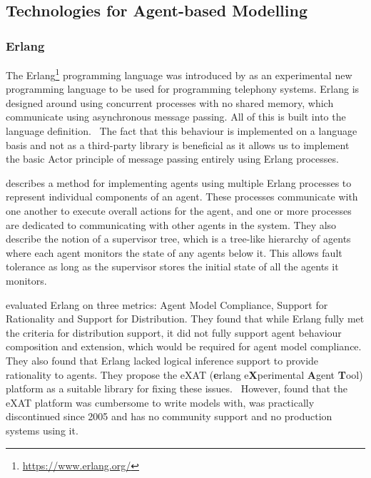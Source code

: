 \subsection{Technologies for Agent-based Modelling}

\subsubsection{Erlang}

The Erlang\footnote{\url{https://www.erlang.org/}} programming language was introduced by  as an experimental new programming language to be used for programming telephony systems.
Erlang is designed around using concurrent processes with no shared memory, which communicate using asynchronous message passing.
All of this is built into the language definition.~\cite{armstrong2007history}
The fact that this behaviour is implemented on a language basis and not as a third-party library is beneficial as it allows us to implement the basic Actor principle of message passing entirely using Erlang processes.

 describes a method for implementing agents using multiple Erlang processes to represent individual components of an agent.
These processes communicate with one another to execute overall actions for the agent, and one or more processes are dedicated to communicating with other agents in the system.
They also describe the notion of a supervisor tree, which is a tree-like hierarchy of agents where each agent monitors the state of any agents below it.
This allows fault tolerance as long as the supervisor stores the initial state of all the agents it monitors.

 evaluated Erlang on three metrics: Agent Model Compliance, Support for Rationality and Support for Distribution.
They found that while Erlang fully met the criteria for distribution support, it did not fully support agent behaviour composition and extension, which would be required for agent model compliance.
They also found that Erlang lacked logical inference support to provide rationality to agents.
They propose the eXAT (\textbf{e}rlang e\textbf{X}perimental \textbf{A}gent \textbf{T}ool) platform as a suitable library for fixing these issues.~\cite{di2003exat}
However,  found that the eXAT platform was cumbersome to write models with, was practically discontinued since 2005 and has no community support and no production systems using it.

